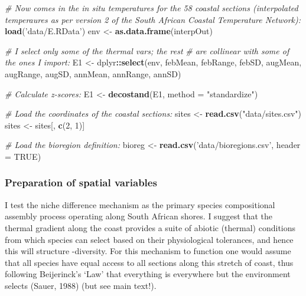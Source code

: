 \documentclass[10pt,A4,]{article}
\newenvironment{Shaded}{\begin{snugshade}}{\end{snugshade}}
\newcommand{\KeywordTok}[1]{\textcolor[rgb]{0.13,0.29,0.53}{\textbf{#1}}}
\newcommand{\DataTypeTok}[1]{\textcolor[rgb]{0.13,0.29,0.53}{#1}}
\newcommand{\DecValTok}[1]{\textcolor[rgb]{0.00,0.00,0.81}{#1}}
\newcommand{\StringTok}[1]{\textcolor[rgb]{0.31,0.60,0.02}{#1}}
\newcommand{\CommentTok}[1]{\textcolor[rgb]{0.56,0.35,0.01}{\textit{#1}}}
\newcommand{\OtherTok}[1]{\textcolor[rgb]{0.56,0.35,0.01}{#1}}
\newcommand{\OperatorTok}[1]{\textcolor[rgb]{0.81,0.36,0.00}{\textbf{#1}}}
\newcommand{\NormalTok}[1]{#1}
\begin{document}
\begin{Shaded}
\begin{Highlighting}[]
\CommentTok{# Now comes in the in situ temperatures for the 58 coastal sections (interpolated temperaures as per version 2 of the South African Coastal Temperature Network):}
\KeywordTok{load}\NormalTok{(}\StringTok{'data/E.RData'}\NormalTok{)}
\NormalTok{env <-}\StringTok{ }\KeywordTok{as.data.frame}\NormalTok{(interpOut)}

\CommentTok{# I select only some of the thermal vars; the rest}
\CommentTok{# are collinear with some of the ones I import:}
\NormalTok{E1 <-}\StringTok{ }\NormalTok{dplyr}\OperatorTok{::}\KeywordTok{select}\NormalTok{(env, febMean, febRange, febSD, augMean,}
\NormalTok{                    augRange, augSD, annMean, annRange, annSD)}

\CommentTok{# Calculate z-scores:}
\NormalTok{E1 <-}\StringTok{ }\KeywordTok{decostand}\NormalTok{(E1, }\DataTypeTok{method =} \StringTok{"standardize"}\NormalTok{)}

\CommentTok{# Load the coordinates of the coastal sections:}
\NormalTok{sites <-}\StringTok{ }\KeywordTok{read.csv}\NormalTok{(}\StringTok{"data/sites.csv"}\NormalTok{)}
\NormalTok{sites <-}\StringTok{ }\NormalTok{sites[, }\KeywordTok{c}\NormalTok{(}\DecValTok{2}\NormalTok{, }\DecValTok{1}\NormalTok{)]}

\CommentTok{# Load the bioregion definition:}
\NormalTok{bioreg <-}\StringTok{ }\KeywordTok{read.csv}\NormalTok{(}\StringTok{'data/bioregions.csv'}\NormalTok{, }\DataTypeTok{header =} \OtherTok{TRUE}\NormalTok{)}
\end{Highlighting}
\end{Shaded}

\subsubsection*{Preparation of spatial variables}

I test the niche difference mechanism as the primary species
compositional assembly process operating along South African shores. I
suggest that the thermal gradient along the coast provides a suite of
abiotic (thermal) conditions from which species can select based on
their physiological tolerances, and hence this will structure
\textbeta-diversity. For this mechanism to function one would assume
that all species have equal access to all sections along this stretch of
coast, thus following Beijerinck's `Law' that everything is everywhere
but the environment selects (Sauer, 1988) (but see main text!).
\end{document}
